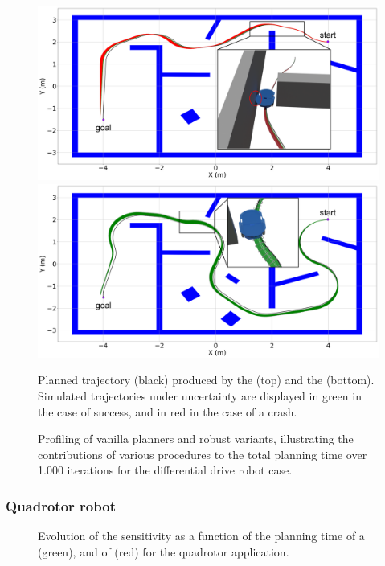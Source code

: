 \begin{figure} [ht]
    \centering
    \includegraphics[width=0.9\linewidth]{figures/samp/non_robust_unic.png}
    \includegraphics[width=0.9\linewidth]{figures/samp/robust_unic.png}
    \caption{Planned trajectory (black) produced by the  (top) and the  (bottom). 
    Simulated trajectories under uncertainty are displayed in green in the case of success, and in red in the case of a crash.}%
    \label{fig:robust_unic}%
\end{figure}

\begin{figure} [ht]
    \centering
     
    \caption{Profiling of vanilla planners and robust variants, illustrating the contributions of various procedures to the total planning time over 1.000 iterations for the differential drive robot case.}%
    \label{fig:profiling_unic}%
\end{figure}

\subsubsection{Quadrotor robot}

\begin{figure} [h]
    \centering
     
    \caption{Evolution of the sensitivity as a function of the planning time of a  (green), and of  (red) for the quadrotor application.}%
    \label{fig:samp_quad_time}%
\end{figure}

